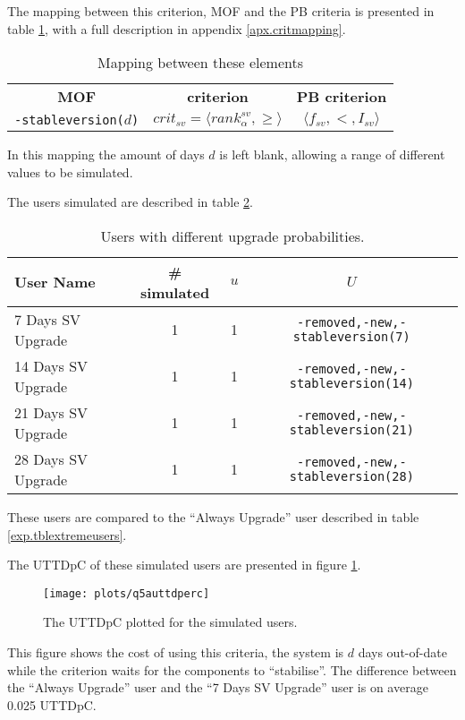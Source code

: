 The mapping between this criterion, MOF and the PB criteria is presented in table \ref{exp.stablcritmapping}, with a full description in appendix \ref{apx.critmapping}.
\begin{table}[htp]
\begin{tabular}{c | c | c}
\textbf{MOF} 		& \textbf{\modelname criterion} & \textbf{PB criterion} \\
\texttt{-stableversion(}$d$\texttt{)} & $crit_{sv} = \langle rank^{sv}_{\alpha}, \geq \rangle$ & $\langle f_{sv}, <, I_{sv} \rangle$ \\
\end{tabular}
\caption{Mapping between these elements}
\label{exp.stablcritmapping}
\end{table}
In this mapping the amount of days $d$ is left blank, allowing a range of different values to be simulated.

The users simulated are described in table \ref{exp.tblsvusers}.
\begin{table}[h!]
\centering
\begin{tabular}{|l | c | c | c | }
\hline
User Name 				& \# simulated 	& $u$ 	& $U$ 			\\ \hline
7 Days SV Upgrade		& 1 			& 1 & 	\texttt{-removed,-new,-stableversion(7)}			 \\
14 Days SV Upgrade		& 1 			& 1 & 	\texttt{-removed,-new,-stableversion(14)}			\\
21 Days SV Upgrade		& 1 			& 1 & 	\texttt{-removed,-new,-stableversion(21)}			 \\
28 Days SV Upgrade 		& 1 			& 1 & 	\texttt{-removed,-new,-stableversion(28)}			\\ \hline
\end{tabular}
\caption{Users with different upgrade probabilities.}
\label{exp.tblsvusers}
\end{table}
These users are compared to the ``Always Upgrade'' user described in table \ref{exp.tblextremeusers}.

The UTTDpC of these simulated users are presented in figure \ref{exp.q5auttdperc}.
\begin{figure}[htp]
\begin{center}
  \texttt{[image: plots/q5auttdperc]}
  \caption{The UTTDpC plotted for the simulated users.}
  \label{exp.q5auttdperc}
\end{center}
\end{figure}

This figure shows the cost of using this criteria, the system is $d$ days out-of-date while the criterion waits for the components to ``stabilise''.
The difference between the ``Always Upgrade'' user and the ``7 Days SV Upgrade'' user is on average 0.025 UTTDpC.

